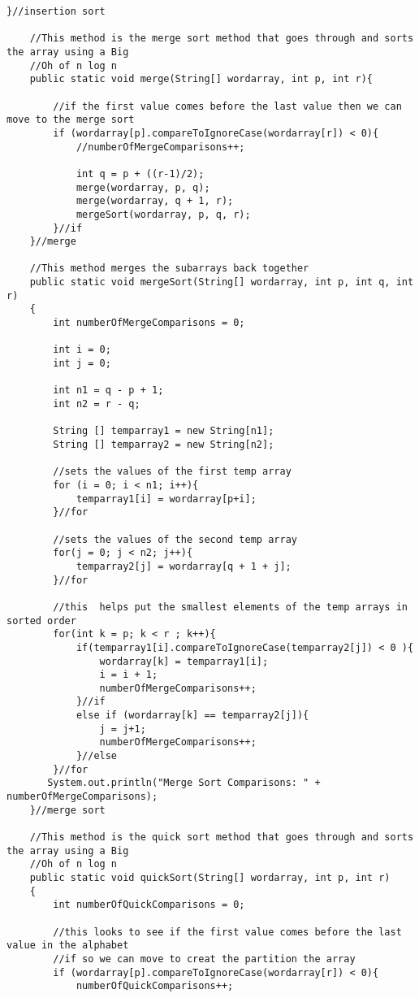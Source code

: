 \documentclass[letterpaper, 10pt,DIV=13]{scrartcl}
\numberwithin{equation}{section} %
\numberwithin{figure}{section} %
\numberwithin{table}{section} %
\begin{document}
\begin{lstlisting}[frame=single, ]
    }//insertion sort

    //This method is the merge sort method that goes through and sorts the array using a Big 
    //Oh of n log n
    public static void merge(String[] wordarray, int p, int r){

        //if the first value comes before the last value then we can move to the merge sort
        if (wordarray[p].compareToIgnoreCase(wordarray[r]) < 0){
            //numberOfMergeComparisons++;

            int q = p + ((r-1)/2);
            merge(wordarray, p, q);
            merge(wordarray, q + 1, r);
            mergeSort(wordarray, p, q, r);
        }//if
    }//merge

    //This method merges the subarrays back together
    public static void mergeSort(String[] wordarray, int p, int q, int r)
    {
        int numberOfMergeComparisons = 0;

        int i = 0;
        int j = 0;

        int n1 = q - p + 1;
        int n2 = r - q;

        String [] temparray1 = new String[n1];
        String [] temparray2 = new String[n2];

        //sets the values of the first temp array
        for (i = 0; i < n1; i++){
            temparray1[i] = wordarray[p+i];
        }//for

        //sets the values of the second temp array
        for(j = 0; j < n2; j++){
            temparray2[j] = wordarray[q + 1 + j];
        }//for

        //this  helps put the smallest elements of the temp arrays in sorted order
        for(int k = p; k < r ; k++){
            if(temparray1[i].compareToIgnoreCase(temparray2[j]) < 0 ){
                wordarray[k] = temparray1[i];
                i = i + 1;
                numberOfMergeComparisons++;
            }//if
            else if (wordarray[k] == temparray2[j]){
                j = j+1;
                numberOfMergeComparisons++;
            }//else
        }//for
       System.out.println("Merge Sort Comparisons: " + numberOfMergeComparisons);
    }//merge sort

    //This method is the quick sort method that goes through and sorts the array using a Big
    //Oh of n log n
    public static void quickSort(String[] wordarray, int p, int r)
    {
        int numberOfQuickComparisons = 0;

        //this looks to see if the first value comes before the last value in the alphabet
        //if so we can move to creat the partition the array
        if (wordarray[p].compareToIgnoreCase(wordarray[r]) < 0){
            numberOfQuickComparisons++;
    

\end{lstlisting}
\end{document}
